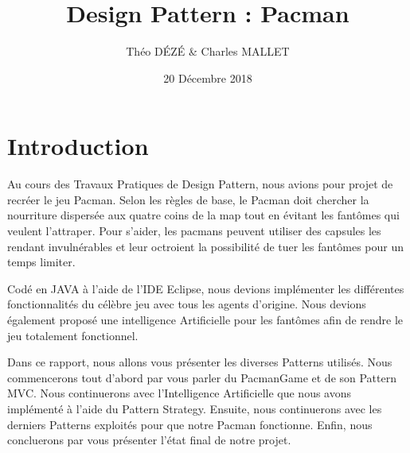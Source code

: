 \documentclass[a4paper, 11pt]{article}
\begin{document}
\title{Design Pattern : Pacman}
\author{Théo \textsc{DÉZÉ}  \& Charles \textsc {MALLET}}
\date{20 Décembre 2018} 



\maketitle

\newpage

\tableofcontents

\pagebreak

\part*{Introduction}

Au cours des Travaux Pratiques de Design Pattern, nous avions pour projet de recréer le jeu Pacman. Selon les règles de base, le Pacman doit chercher la nourriture dispersée aux quatre 
coins de la map tout en évitant les fantômes qui veulent l'attraper. Pour s'aider, les pacmans peuvent utiliser des capsules les rendant invulnérables et leur octroient 
la possibilité de tuer les fantômes pour un temps limiter.

Codé en JAVA à l'aide de l'IDE Eclipse, nous devions implémenter les différentes fonctionnalités du célèbre jeu avec tous les agents d'origine. Nous devions également
proposé une intelligence Artificielle pour les fantômes afin de rendre le jeu totalement fonctionnel. 

Dans ce rapport, nous allons vous présenter les diverses Patterns utilisés. Nous commencerons tout d'abord par vous parler du PacmanGame et de son Pattern MVC. Nous continuerons
avec l'Intelligence Artificielle que nous avons implémenté à l'aide du Pattern Strategy. Ensuite, nous continuerons avec les derniers Patterns exploités pour que notre 
Pacman fonctionne. Enfin, nous concluerons par vous présenter l'état final de notre projet.
\end{document}
